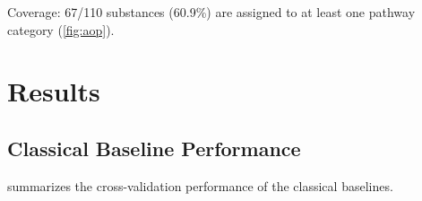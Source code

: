 \documentclass[12pt,a4paper]{article}
\newcommand{\nsub}{110}
\begin{document}
Coverage: 67/\nsub{} substances (60.9\%) are assigned to at least one
pathway category (\cref{fig:aop}).


\section{Results}
\label{sec:results}

\subsection{Classical Baseline Performance}
\label{sec:results_classical}

 summarizes the cross-validation performance of the
classical baselines.
\end{document}
